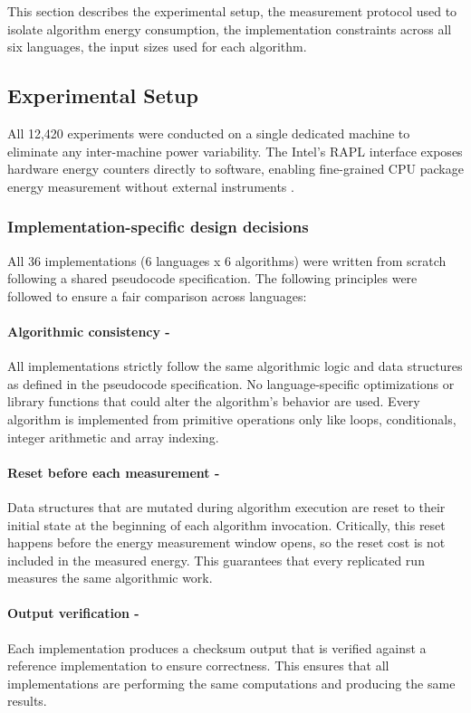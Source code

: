 This section describes the experimental setup, the measurement protocol used to isolate algorithm energy consumption, the implementation constraints across all six languages, the input sizes used for each algorithm.

\subsection{Experimental Setup}
All 12,420 experiments were conducted on a single dedicated machine to eliminate any inter-machine power variability. 
The Intel's RAPL interface exposes hardware energy counters directly to software, enabling fine-grained CPU package energy measurement without external instruments 
\cite{10.1145/3177754}. 

\subsubsection{Implementation-specific design decisions}
All 36 implementations (6 languages x 6 algorithms) were written from scratch following a shared pseudocode specification. The following principles were followed to ensure a fair comparison across languages:

\paragraph{Algorithmic consistency -}All implementations strictly follow the same algorithmic logic and data structures as defined in the pseudocode specification. No language-specific optimizations or library functions that could alter the algorithm's behavior are used. Every algorithm is implemented from primitive operations only like loops, conditionals, integer arithmetic and array indexing.

\paragraph{Reset before each measurement -}Data structures that are mutated during  algorithm execution are reset to their initial state at the beginning of each algorithm invocation. Critically, this reset happens before the energy measurement window opens, so the reset cost is not included in the measured energy. This guarantees that every replicated run measures the same algorithmic work.

\paragraph{Output verification -}Each implementation produces a checksum output that is verified against a reference implementation to ensure correctness. This ensures that all implementations are performing the same computations and producing the same results.

